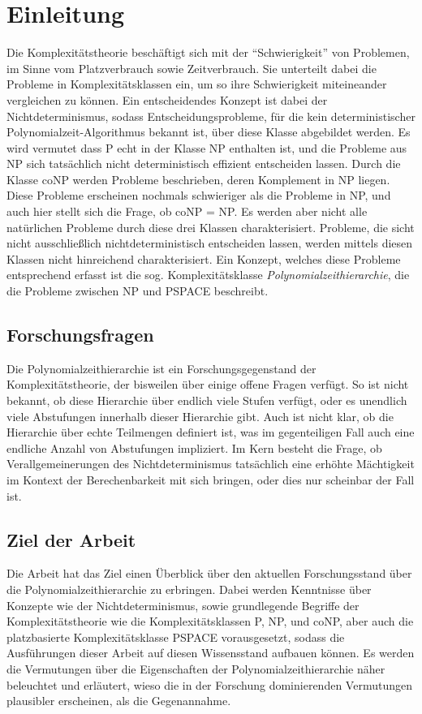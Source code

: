 \chapter{Einleitung}
Die Komplexitätstheorie beschäftigt sich mit der \enquote{Schwierigkeit} von Problemen, im Sinne vom Platzverbrauch sowie Zeitverbrauch. Sie unterteilt dabei die Probleme in Komplexitätsklassen ein, 
um so ihre Schwierigkeit miteineander vergleichen zu können. Ein entscheidendes Konzept ist dabei der Nichtdeterminismus, sodass Entscheidungsprobleme, für die kein deterministischer Polynomialzeit-Algorithmus bekannt ist,
über diese Klasse abgebildet werden. Es wird vermutet dass P echt in der Klasse NP enthalten ist, und die Probleme aus NP sich tatsächlich nicht deterministisch effizient entscheiden lassen.
Durch die Klasse coNP werden Probleme beschrieben, deren Komplement in NP liegen. Diese Probleme erscheinen nochmals schwieriger als die Probleme in NP, und auch hier stellt sich die Frage, ob coNP = NP.
Es werden aber nicht alle natürlichen Probleme durch diese drei Klassen charakterisiert. Probleme, die sicht nicht ausschließlich nichtdeterministisch entscheiden lassen, werden mittels diesen Klassen nicht hinreichend charakterisiert.
Ein Konzept, welches diese Probleme entsprechend erfasst ist die sog. Komplexitätsklasse \emph{Polynomialzeithierarchie}, die die Probleme zwischen NP und PSPACE beschreibt. 

\section{Forschungsfragen}
Die Polynomialzeithierarchie ist ein Forschungsgegenstand der Komplexitätstheorie, der bisweilen über einige offene Fragen verfügt. 
So ist nicht bekannt, ob diese Hierarchie über endlich viele Stufen verfügt, oder es unendlich viele Abstufungen innerhalb dieser Hierarchie gibt.
Auch ist nicht klar, ob die Hierarchie über echte Teilmengen definiert ist, was im gegenteiligen Fall auch eine endliche Anzahl von Abstufungen impliziert.
Im Kern besteht die Frage, ob Verallgemeinerungen des Nichtdeterminismus tatsächlich eine erhöhte Mächtigkeit im Kontext der Berechenbarkeit mit sich bringen, oder dies nur scheinbar der Fall ist.

\section{Ziel der Arbeit}
Die Arbeit hat das Ziel einen Überblick über den aktuellen Forschungsstand über die Polynomialzeithierarchie zu erbringen. Dabei werden Kenntnisse über Konzepte wie der Nichtdeterminismus, sowie grundlegende Begriffe der Komplexitätstheorie
wie die Komplexitätsklassen P, NP, und coNP, aber auch die platzbasierte Komplexitätsklasse PSPACE vorausgesetzt, sodass die Ausführungen dieser Arbeit auf diesen Wissensstand aufbauen können.
Es werden die Vermutungen über die Eigenschaften der Polynomialzeithierarchie näher beleuchtet und erläutert, wieso die in der Forschung dominierenden Vermutungen plausibler erscheinen, als die Gegenannahme.

